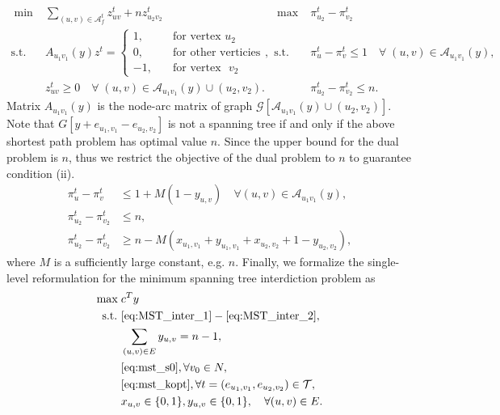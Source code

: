 \documentclass[11pt]{article}
\newcommand{\G}{\mathcal{G}}
\newcommand{\T}{\mathcal{T}}
\newcommand{\Aa}{\mathcal{A}}
\begin{document}
\begin{align*}
\;\min\;& \sum_{(u,v)\in \mathcal{A}_f^t} z^t_{uv} + nz_{u_2v_2}^t \hspace{50pt} &\;\max\; &\pi_{u_2}^t - \pi_{v_2}^t \\
\text{s.t.~~}& A_{u_1v_1}(y)z^t = \begin{cases}
1, \quad & \text{for vertex~} u_2 \\
0, \quad & \text{for other verticies} \\
-1, \quad & \text{for vertex ~} v_2
\end{cases}, & \text{s.t.~~}& \pi_{u}^t - \pi_{v}^t \leq 1\quad\forall\; (u, v) \in \Aa_{u_1v_1}(y),\\
& z_{uv}^t \geq 0 \quad\forall \; (u, v)\in \Aa_{u_1v_1}(y)\cup (u_2, v_2). && \pi^t_{u_2} - \pi^t_{v_2} \leq n.
\end{align*}
Matrix $A_{u_1v_1}(y)$ is the node-arc matrix of graph $\G[\Aa_{u_1v_1}(y) \cup (u_2, v_2)]$. Note that $G[y + e_{u_1,v_1} - e_{u_2,v_2}]$ is not a spanning tree if and only if the above shortest path problem has optimal value $n$. Since the upper bound for the dual problem is $n$, thus we restrict the objective of the dual problem to $n$ to guarantee condition (ii).
\begin{subequations} \label{eq:mst_kopt}
	\begin{align}
	\pi_u^t - \pi_v^t & \leq 1 + M(1 - y_{u,v}) \quad \forall (u,v) \in \Aa_{u_1v_1}(y), \\
	\pi^t_{u_2} - \pi^t_{v_2} & \leq n, \\
	\pi^t_{u_2} - \pi^t_{v_2} & \geq n - M(x_{u_1,v_1} + y_{u_1, v_1} + x_{u_2, v_2} + 1 - y_{u_2, v_2}),
	\end{align}
\end{subequations}
where $M$ is a sufficiently large constant, e.g. $n$. Finally, we formalize the single-level reformulation for the minimum spanning tree interdiction problem as
\begin{align*}
[BMST_1]\max\;&  c^Ty \\
\text{s.t.~} & \eqref{eq:MST_inter_1} - \eqref{eq:MST_inter_2}, \\
& \sum_{(u, v) \in E} y_{u,v} = n - 1,\\
& \eqref{eq:mst_s0}, \forall v_0 \in N, \\
& \eqref{eq:mst_kopt}, \forall t = (e_{u_1, v_1}, e_{u_2, v_2}) \in \T, \\
& x_{u,v} \in \{0,1\}, y_{u,v} \in \{0, 1\}, \quad \forall (u,v) \in E.
\end{align*}
\end{document}
